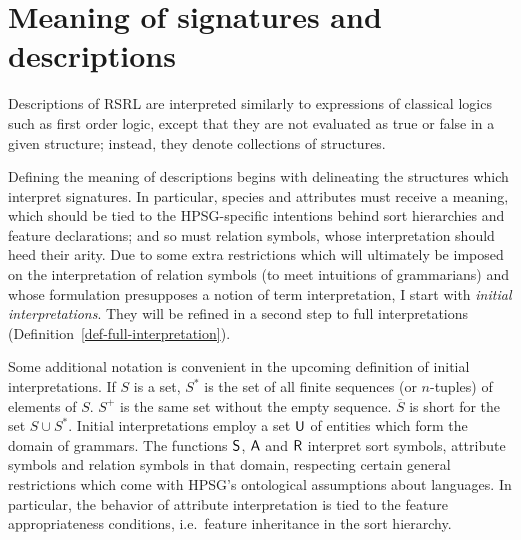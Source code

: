 \documentclass[output=paper
 	        ,biblatex
                ,babelshorthands
                ,newtxmath
                ,draftmode
                ,colorlinks, citecolor=brown
]{langscibook}
\begin{document}
{\section{Meaning of signatures and descriptions}
\label{sec-meaning}

Descriptions of RSRL are interpreted similarly to expressions of
classical logics such as first order logic, except that they are not
evaluated as true or false in a given structure; instead, they denote
collections of structures.

Defining the meaning of descriptions begins with delineating the
structures which interpret signatures. In particular, species and
attributes must receive a meaning, which should be tied to the
HPSG-specific intentions behind sort hierarchies and feature
declarations; and so must relation symbols, whose interpretation
should heed their arity. Due to some extra restrictions which will
ultimately be imposed on the interpretation of relation symbols (to meet
intuitions of grammarians) and whose
formulation presupposes a notion of term interpretation, I start with
\emph{initial interpretations}. They will be refined in a second
step to full interpretations (Definition~\ref{def-full-interpretation}).

Some additional notation is convenient in the upcoming definition of
initial interpretations. If $S$ is a
set, $S^{*}$ is the set of all finite sequences (or $n$-tuples) of elements
of $S$. $S^{+}$ is the same set without the empty sequence. $\overline{S}$
is short for the set $S\cup S^{*}$. Initial interpretations employ a set
$\mathsf{U}$ of entities which form the domain of grammars. The functions
$\mathsf{S}$, $\mathsf{A}$ and $\mathsf{R}$ interpret sort symbols, attribute symbols
and relation symbols in that domain, respecting certain general restrictions which come with
HPSG's ontological assumptions about languages. In particular, the behavior of
attribute interpretation is tied to the feature appropriateness conditions,
i.e.\ feature inheritance in the sort hierarchy.

}
\end{document}
